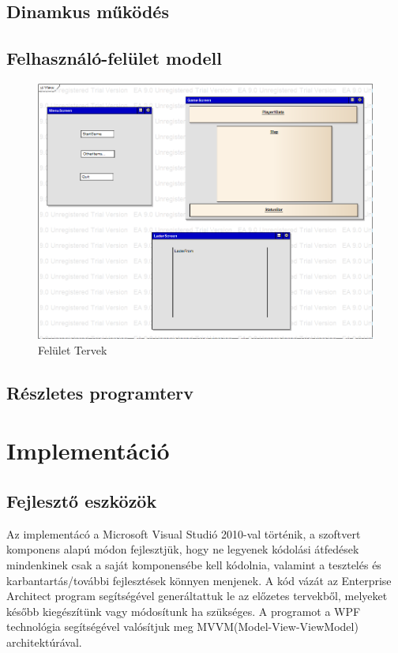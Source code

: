 \documentclass[a4paper,12pt]{report}
\begin{document}
\section{Dinamkus működés}

\section{Felhasználó-felület modell}

\begin{figure}[hbtp]
\centering
\includegraphics[width=1\textwidth]{ViewScreen.png}
\caption{Felület Tervek}
\label{fig:vs}
\end{figure}

\section{Részletes programterv}

\chapter{Implementáció}

\section{Fejlesztő eszközök}

Az implementácó a Microsoft Visual Studió 2010-val történik, a szoftvert komponens alapú módon fejlesztjük,
hogy ne legyenek kódolási átfedések mindenkinek csak a saját komponensébe kell kódolnia, valamint a tesztelés és karbantartás/további fejlesztések könnyen menjenek.
A kód vázát az Enterprise Architect program segítségével generáltattuk le az előzetes tervekből, melyeket később kiegészítünk vagy módosítunk ha szükséges. A programot a WPF technológia segítségével valósítjuk meg MVVM(Model-View-ViewModel) architektúrával.
\end{document}
